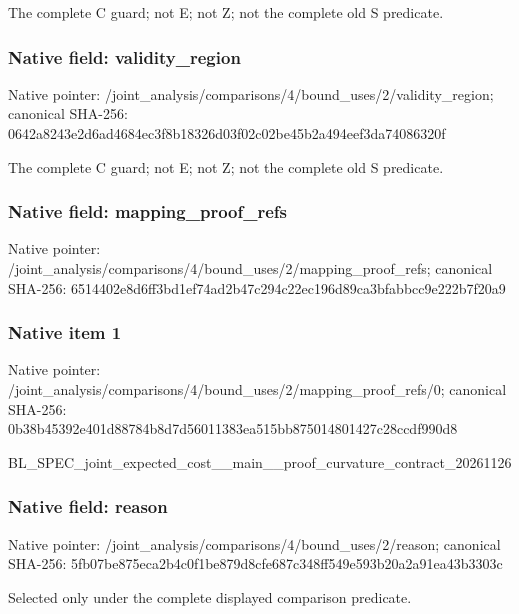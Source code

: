 \documentclass[10pt,a4paper]{article}
\begin{document}
The complete C guard; not E; not Z; not the complete old S predicate.


\subsubsection{Native field: validity\_region}


Native pointer: /joint\_analysis/comparis\allowbreak{}ons/4/bound\_uses/2/valid\allowbreak{}ity\_region; canonical SHA-256: 0642a8243e2d6ad4684ec3f8\allowbreak{}b18326d03f02c02be45b2a49\allowbreak{}4eef3da74086320f


The complete C guard; not E; not Z; not the complete old S predicate.


\subsubsection{Native field: mapping\_proof\_refs}


Native pointer: /joint\_analysis/comparis\allowbreak{}ons/4/bound\_uses/2/mappi\allowbreak{}ng\_proof\_refs; canonical SHA-256: 6514402e8d6ff3bd1ef74ad2\allowbreak{}b47c294c22ec196d89ca3bfa\allowbreak{}bbcc9e222b7f20a9



\subsubsection{Native item 1}


Native pointer: /joint\_analysis/comparis\allowbreak{}ons/4/bound\_uses/2/mappi\allowbreak{}ng\_proof\_refs/0; canonical SHA-256: 0b38b45392e401d88784b8d7\allowbreak{}d56011383ea515bb87501480\allowbreak{}1427c28ccdf990d8


BL\_SPEC\_joint\_expected\_c\allowbreak{}ost\_\_main\_\_proof\_curvatu\allowbreak{}re\_contract\_20261126


\subsubsection{Native field: reason}


Native pointer: /joint\_analysis/comparis\allowbreak{}ons/4/bound\_uses/2/reaso\allowbreak{}n; canonical SHA-256: 5fb07be875eca2b4c0f1be87\allowbreak{}9d8cfe687c348ff549e593b2\allowbreak{}0a2a91ea43b3303c


Selected only under the complete displayed comparison predicate.
\end{document}
